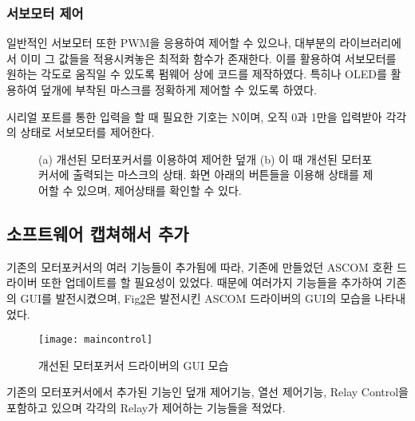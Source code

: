 \subsubsection{서보모터 제어}
 일반적인 서보모터 또한 PWM을 응용하여 제어할 수 있으나, 대부분의 라이브러리에서 이미 그 값들을 적용시켜놓은 최적화 함수가 존재한다. 이를 활용하여 서보모터를 원하는 각도로 움직일 수 있도록 펌웨어 상에 코드를 제작하였다. 특히나 OLED를 활용하여 덮개에 부착된 마스크를 정확하게 제어할 수 있도록 하였다.
 
 시리얼 포트를 통한 입력을 할 때 필요한 기호는 N이며, 오직 0과 1만을 입력받아 각각의 상태로 서보모터를 제어한다.

	\begin{figure}[ht]
	\begin{center}
	\end{center}
	\caption{(a) 개선된 모터포커서를 이용하여 제어한 덮개 (b) 이 때 개선된 모터포커서에 출력되는 마스크의 상태. 화면 아래의 버튼들을 이용해 상태를 제어할 수 있으며, 제어상태를 확인할 수 있다.}
\label{mask_status}


\end{figure}


 
\newpage

\subsection{소프트웨어 캡쳐해서 추가}


 기존의 모터포커서의 여러 기능들이 추가됨에 따라, 기존에 만들었던 ASCOM 호환 드라이버 또한 업데이트를 할 필요성이 있었다. 때문에 여러가지 기능들을 추가하여 기존의 GUI를 발전시켰으며, Fig\ref{maincontrol}은 발전시킨 ASCOM 드라이버의 GUI의 모습을 나타내었다.
 
 \begin{figure}[h]
	\begin{center}
		\texttt{[image: maincontrol]}
	\end{center}
	\caption{개선된 모터포커서 드라이버의 GUI 모습}
	\label{maincontrol}
\end{figure}

 기존의 모터포커서에서 추가된 기능인 덮개 제어기능, 열선 제어기능, Relay Control을 포함하고 있으며 각각의 Relay가 제어하는 기능들을 적었다.
